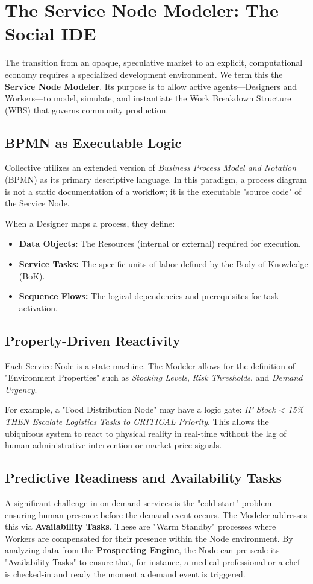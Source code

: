 \section{The Service Node Modeler: The Social IDE}

The transition from an opaque, speculative market to an explicit, computational economy requires a specialized development environment. We term this the \textbf{Service Node Modeler}. Its purpose is to allow active agents—Designers and Workers—to model, simulate, and instantiate the Work Breakdown Structure (WBS) that governs community production.

\subsection{BPMN as Executable Logic}
Collective utilizes an extended version of \textit{Business Process Model and Notation} (BPMN) as its primary descriptive language. In this paradigm, a process diagram is not a static documentation of a workflow; it is the executable "source code" of the Service Node. 

When a Designer maps a process, they define:
\begin{itemize}[leftmargin=*]
    \item \textbf{Data Objects:} The Resources (internal or external) required for execution.
    \item \textbf{Service Tasks:} The specific units of labor defined by the Body of Knowledge (BoK).
    \item \textbf{Sequence Flows:} The logical dependencies and prerequisites for task activation.
\end{itemize}

\subsection{Property-Driven Reactivity}
Each Service Node is a state machine. The Modeler allows for the definition of "Environment Properties" such as \textit{Stocking Levels}, \textit{Risk Thresholds}, and \textit{Demand Urgency}. 

For example, a "Food Distribution Node" may have a logic gate: \textit{IF Stock < 15\% THEN Escalate Logistics Tasks to CRITICAL Priority}. This allows the ubiquitous system to react to physical reality in real-time without the lag of human administrative intervention or market price signals.

\subsection{Predictive Readiness and Availability Tasks}
A significant challenge in on-demand services is the "cold-start" problem—ensuring human presence before the demand event occurs. The Modeler addresses this via \textbf{Availability Tasks}. These are "Warm Standby" processes where Workers are compensated for their presence within the Node environment. By analyzing data from the \textbf{Prospecting Engine}, the Node can pre-scale its "Availability Tasks" to ensure that, for instance, a medical professional or a chef is checked-in and ready the moment a demand event is triggered.
